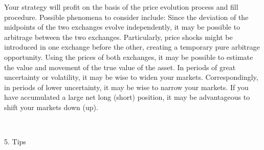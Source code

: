 \documentclass[12pt]{article}
\begin{document}
Your strategy will profit on the basis of the price evolution process and fill procedure. Possible phenomena to consider include:
Since the deviation of the midpoints of the two exchanges evolve independently, it may be possible to arbitrage between the two exchanges. Particularly, price shocks might be introduced in one exchange before the other, creating a temporary pure arbitrage opportunity.
Using the prices of both exchanges, it may be possible to estimate the value and movement of the true value of the asset.
In periods of great uncertainty or volatility, it may be wise to widen your markets. Correspondingly, in periods of lower uncertainty, it may be wise to narrow your markets.
If you have accumulated a large net long (short) position, it may be advantageous to shift your markets down (up).

\ \\
\begin{center}5. Tips\end{center}
\end{document}
